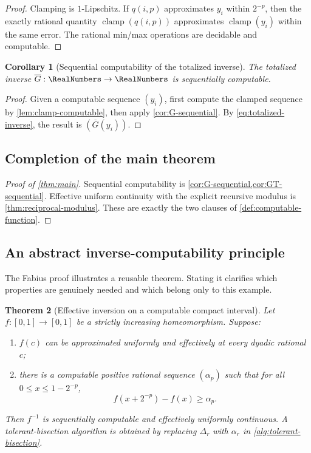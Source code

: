 \documentclass[11pt,oneside]{article}
\newtheorem{theorem}{Theorem}[section]
\newtheorem{corollary}[theorem]{Corollary}
\theoremstyle{definition}
\theoremstyle{remark}
\numberwithin{equation}{section}
\newcommand{\InvT}{\overline G}
\newcommand{\Clamp}{\operatorname{clamp}}
\begin{document}
\begin{proof}
Clamping is $1$-Lipschitz.  If $q(i,p)$ approximates $y_i$ within $2^{-p}$,
then the exactly rational quantity $\Clamp(q(i,p))$ approximates
$\Clamp(y_i)$ within the same error.  The rational min/max operations are
decidable and computable.
\end{proof}

\begin{corollary}[Sequential computability of the totalized inverse]
\label{cor:GT-sequential}
The totalized inverse $\InvT:\RealNumbers\to\RealNumbers$ is sequentially computable.
\end{corollary}

\begin{proof}
Given a computable sequence $(y_i)$, first compute the clamped sequence by
\cref{lem:clamp-computable}, then apply \cref{cor:G-sequential}.  By
\eqref{eq:totalized-inverse}, the result is $(\InvT(y_i))$.
\end{proof}

\subsection{Completion of the main theorem}

\begin{proof}[Proof of \cref{thm:main}]
Sequential computability is \cref{cor:G-sequential,cor:GT-sequential}.
Effective uniform continuity with the explicit recursive modulus is
\cref{thm:reciprocal-modulus}.  These are exactly the two clauses of
\cref{def:computable-function}.
\end{proof}

\subsection{An abstract inverse-computability principle}

The Fabius proof illustrates a reusable theorem.  Stating it clarifies which
properties are genuinely needed and which belong only to this example.

\begin{theorem}[Effective inversion on a computable compact interval]
\label{thm:abstract-inversion}
Let $f:[0,1]\to[0,1]$ be a strictly increasing homeomorphism.  Suppose:
\begin{enumerate}
\item $f(c)$ can be approximated uniformly and effectively at every dyadic
      rational $c$;
\item there is a computable positive rational sequence $(\alpha_p)$ such that
      for all $0\le x\le1-2^{-p}$,
      \begin{equation}\label{eq:abstract-gap}
       f(x+2^{-p})-f(x)\ge\alpha_p.
      \end{equation}
\end{enumerate}
Then $f^{-1}$ is sequentially computable and effectively uniformly continuous.
A tolerant-bisection algorithm is obtained by replacing $\Delta_r$ with
$\alpha_r$ in \cref{alg:tolerant-bisection}.
\end{theorem}
\end{document}

